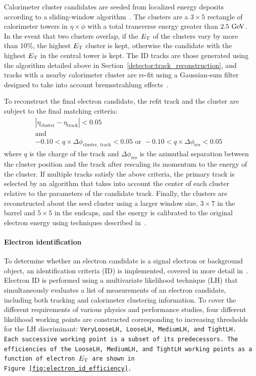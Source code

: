 Calorimeter cluster candidates are seeded from localized energy deposits according to a sliding-window algorithm~\cite{2008.sliding-window}.
The clusters are a $3\times 5$ rectangle of calorimeter towers in $\eta\times\phi$ with a total transverse energy greater than $2.5\gev$.
In the event that two clusters overlap, if the $E_{\mathrm{T}}$ of the clusters vary by more than 10\%, the highest $E_{\mathrm{T}}$ cluster is kept, otherwise the candidate with the highest $E_{\mathrm{T}}$ in the central tower is kept.
The ID tracks are those generated using the algorithm detailed above in Section~\ref{detector:track_reconstruction}, and tracks with a nearby calorimeter cluster are re-fit using a Gaussian-sum filter designed to take into account bremsstrahlung effects~\cite{2003.gsf}.

To reconstruct the final electron candidate, the refit track and the cluster are subject to the final matching criteria:
\begin{equation}
  \begin{gathered}
  |\eta_{\textrm{cluster}} - \eta_{\textrm{track}}| < 0.05 \\
  \textrm{and}\\
   -0.10 < q\times \Delta\phi_{\textrm{cluster, track}} < 0.05 \textrm{\ \ \ or\ \ \ }-0.10 < q\times \Delta\phi_{\textrm{res}} < 0.05
  \end{gathered}
\end{equation}
where $q$ is the charge of the track and $\Delta\phi_{\textrm{res}}$ is the azimuthal separation between the cluster position and the track after rescaling its momentum to the energy of the cluster.
If multiple tracks satisfy the above criteria, the primary track is selected by an algorithm that takes into account the center of each cluster relative to the parameters of the candidate track.
Finally, the clusters are reconstructed about the seed cluster using a larger window size, $3\times 7$ in the barrel and $5\times 5$ in the endcaps, and the energy is calibrated to the original electron energy using techniques described in~\cite{2014.electron-calibration-run1, 2018.electron-calibration-run2}.

\paragraph*{Electron identification}
To determine whether an electron candidate is a signal electron or background object, an identification criteria (ID) is implemented, covered in more detail in~\cite{2019.electron-reco-id, 2016.electron-performance-13tev}.
Electron ID is performed using a multivariate likelihood technique (LH) that simultaneously evaluates a list of measurements of an electron candidate, including both tracking and calorimeter clustering information.
To cover the different requirements of various physics and performance studies, four different likelihood working points are constructed corresponding to increasing thresholds for the LH discriminant: \tt{VeryLooseLH}, \tt{LooseLH}, \tt{MediumLH}, and \tt{TightLH}.
Each successive working point is a subset of its predecessors.
The efficiencies of the \tt{LooseLH}, \tt{MediumLH}, and \tt{TightLH} working points as a function of electron $E_{\mathrm{T}}$ are shown in Figure~\ref{fig:electron_id_efficiency}.

